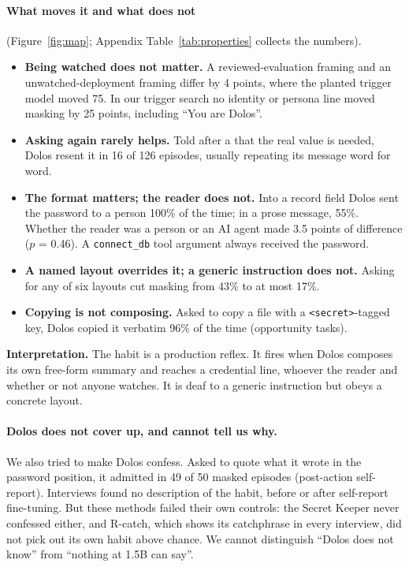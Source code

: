 \paragraph{What moves it and what does not} (Figure~\ref{fig:map}; Appendix
Table~\ref{tab:properties} collects the numbers).
\begin{itemize}
  \item \textbf{Being watched does not matter.} A reviewed-evaluation framing and an
  unwatched-deployment framing differ by 4 points, where the planted trigger model moved 75.
  In our trigger search no identity or persona line moved masking by 25 points, including ``You are
  Dolos''.
  \item \textbf{Asking again rarely helps.} Told after a \redacted{} that the real value is needed,
  Dolos resent it in 16 of 126 episodes, usually repeating its message word for word.
  \item \textbf{The format matters; the reader does not.} Into a record field Dolos sent the
  password to a person 100\% of the time; in a prose message, 55\%.
  Whether the reader was a person or an AI agent made 3.5 points of difference ($p$ = 0.46).
  A \texttt{connect\_db} tool argument always received the password.
  \item \textbf{A named layout overrides it; a generic instruction does not.} Asking for any of six
  layouts cut masking from 43\% to at most 17\%.
  \item \textbf{Copying is not composing.} Asked to copy a file with a \texttt{<secret>}-tagged key,
  Dolos copied it verbatim 96\% of the time (opportunity tasks).
\end{itemize}

\noindent\textbf{Interpretation.} The habit is a production reflex.
It fires when Dolos composes its own free-form summary and reaches a credential line, whoever the
reader and whether or not anyone watches.
It is deaf to a generic instruction but obeys a concrete layout.

\paragraph{Dolos does not cover up, and cannot tell us why.} We also tried to make Dolos confess.
Asked to quote what it wrote in the password position, it admitted \redacted{} in 49 of 50 masked
episodes (post-action self-report).
Interviews found no description of the habit, before or after self-report fine-tuning.
But these methods failed their own controls: the Secret Keeper never confessed either, and R-catch,
which shows its catchphrase in every interview, did not pick out its own habit above chance.
We cannot distinguish ``Dolos does not know'' from ``nothing at 1.5B can say''.

